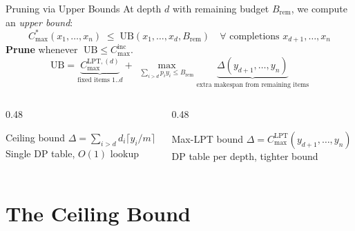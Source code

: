 \documentclass[fleqn,11pt,aspectratio=43]{beamer}
\newcommand{\Copt}{C_{\max}^{*}}
\newcommand{\Clpt}{C_{\max}^{\mathrm{LPT}}}
\newcommand{\Cinc}{C_{\max}^{\mathrm{inc}}}
\newcommand{\Brem}{B_{\mathrm{rem}}}
\newcommand{\UB}{\mathrm{UB}}
\begin{document}
\begin{frame}[shrink=5]{Pruning via Upper Bounds}
  At depth $d$ with remaining budget $\Brem$, we compute an \emph{upper bound}:
  \[\Copt(x_1,\ldots,x_n)\;\leq\;\UB(x_1,\ldots,x_d,\Brem)
    \quad\forall\text{ completions }x_{d+1},\ldots,x_n\]
  \textbf{Prune} whenever $\;\UB\leq\Cinc$.
  \[
    \UB = \underbrace{C_{\max}^{\mathrm{LPT},(d)}}_{\text{fixed items 1..}d}
         +\;\max_{\sum_{i>d}p_iy_i\leq\Brem}
           \underbrace{\Delta(y_{d+1},\ldots,y_n)}_{\text{extra makespan from remaining items}}
  \]
  \begin{columns}[T]
    \begin{column}{0.48\textwidth}
      \begin{block}{Ceiling bound}
        $\Delta = \sum_{i>d}d_i\lceil y_i/m\rceil$\\
        Single DP table, $O(1)$ lookup
      \end{block}
    \end{column}
    \begin{column}{0.48\textwidth}
      \begin{block}{Max-LPT bound}
        $\Delta = \Clpt(y_{d+1},\ldots,y_n)$\\
        DP table per depth, tighter bound
      \end{block}
    \end{column}
  \end{columns}
\end{frame}

\section{The Ceiling Bound}
\end{document}

